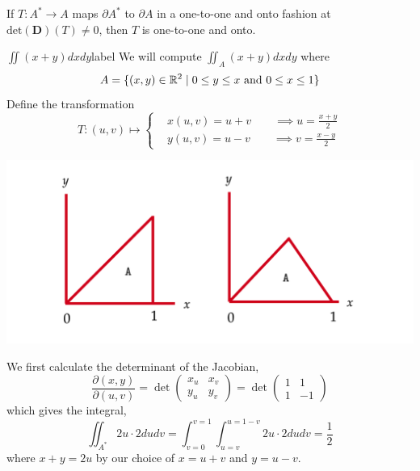 \begin{rmk}
    If $T: A^* \rightarrow A$ maps $\partial A^*$ to $\partial A$ in a one-to-one and onto fashion at $\text{det}(\mathbf{D})(T) \neq 0$, then $T$ is one-to-one and onto.
\end{rmk}

\begin{ex}{$\iint(x+y) d x d y$}{label}
    We will compute $\iint_A (x+y) d x d y$ where
    \[A = \{(x, y) \in \mathbb{R}^2 \mid 0 \leq y \leq x \text{ and } 0 \leq x \leq 1\}\]
    Define the transformation
    \[T:(u, v) \longmapsto \left\{\begin{aligned}
    &x(u, v)=u+v \quad \quad \implies u = \frac{x+y}{2}\\
    &y(u, v)=u-v \quad \quad \implies v = \frac{x-y}{2}
    \end{aligned}\right.\]
    \begin{center}
    \includegraphics[width=0.7\linewidth]{figures/wk-6/fig-10.png}
    \end{center}
    We first calculate the determinant of the Jacobian,
    \[\frac{\partial(x, y)}{\partial(u, v)}=\operatorname{det}\left(\begin{array}{ll}
    x_u & x_v \\
    y_u & y_v
    \end{array}\right) = \operatorname{det}\left(\begin{array}{cc}
    1 & 1 \\
    1 & -1
    \end{array}\right)\]
    which gives the integral,
    \[\iint_{A^*} 2u \cdot 2 du dv = \int_{v=0}^{v=1} \int_{u=v}^{u=1-v} 2u \cdot 2 du dv = \frac{1}{2}\]
    where $x + y = 2u$ by our choice of $x = u + v$ and $y = u - v$.
\end{ex}

